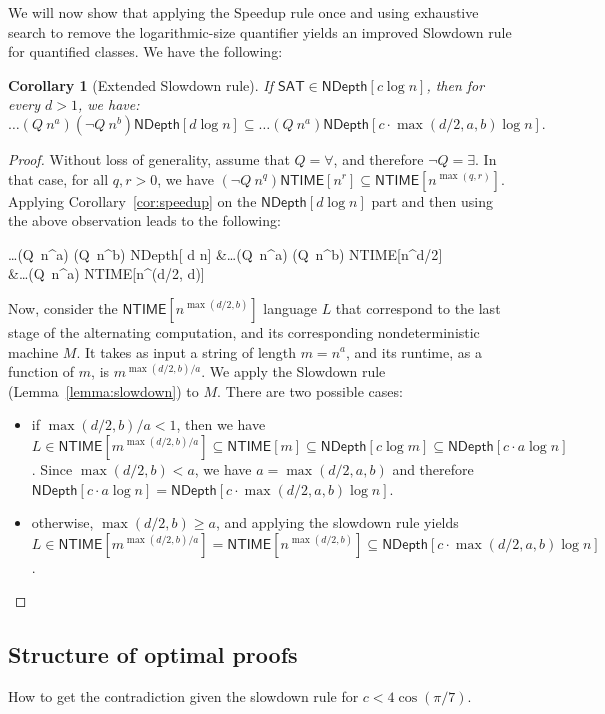 \documentclass[a4paper, 11pt]{article}
\theoremstyle{plain}
\newtheorem{corollary}[theorem]{Corollary}
\theoremstyle{definition}
\theoremstyle{remark}
\newcommand{\NTIME}{\textsf{NTIME}}%
\newcommand{\SAT}{\textsf{SAT}}%
\newcommand{\ND}{\textsf{NDepth}}%
\newcommand{\NDL}[1]{\ND[ #1 \log n]}%
\begin{document}
We will now show that applying the Speedup rule once and
using exhaustive search to remove the logarithmic-size quantifier
yields an improved Slowdown rule for quantified classes.
We have the following:
\begin{corollary}[Extended Slowdown rule]\label{cor:extended_slowdown}
	If $\SAT{}\in \NDL{c}$, then for every $d > 1$, we have:
	\[\ldots (Q~n^{a}) (\neg Q~n^b) \NDL{d}
	\subseteq \ldots (Q~n^{a}) \NDL{c\cdot\max(d/2, a, b)}.\]
\end{corollary}
\begin{proof}
	Without loss of generality, assume that $Q = \forall$, and therefore $\neg Q = \exists$.
	In that case, for all $q, r > 0$, we have $(\neg Q~n^q) \NTIME[n^r] \subseteq \NTIME[n^{\max(q,r)}] $.
	Applying Corollary~\ref{cor:speedup} on the $\NDL{d}$ part and then using the 
	above observation leads to the following:
	\begin{flalign*}
	\ldots (Q~n^{a}) (\neg Q~n^b) \NDL{d} 
	&\subseteq \ldots (Q~n^{a}) (\neg Q~n^b) \NTIME[n^{d/2}]\\	
	&\subseteq \ldots (Q~n^{a}) \NTIME[n^{\max(d/2, d)}]	
	\end{flalign*}

	Now, consider the $\NTIME[n^{\max(d/2, b)}]$ language $L$
	that correspond to the last stage of the alternating 
	computation, and its corresponding nondeterministic machine $M$. 
	It takes as input a string of length $m = n^{a}$, and its runtime, as a function of $m$, 
	is $m^{\max(d/2, b)/a}$.
	We apply the Slowdown rule (Lemma~\ref{lemma:slowdown}) to $M$. There are two possible cases:
	\begin{itemize}
		\item if $\max(d/2, b)/a < 1$, then we have 
		$L \in \NTIME[m^{\max(d/2, b)/a}] \subseteq \NTIME[m]
		\subseteq \ND[c \log m] \subseteq \NDL{c \cdot a}$.
		Since  $\max(d/2, b) < a$, we have $a = \max(d/2, a, b)$ and therefore 
		$\NDL{c \cdot a} = \NDL{c\cdot\max(d/2, a, b)}$.
		\item otherwise, $\max(d/2, b) \ge a$, and applying the slowdown rule yields
		$L \in \NTIME[m^{\max(d/2, b)/a}] =  \NTIME[n^{\max(d/2, b)}] \subseteq \NDL{c \cdot \max(d/2, a, b)}$.
	\end{itemize}
\end{proof}


\subsection{Structure of optimal proofs}
How to get the contradiction given the slowdown rule for $c < 4\cos(\pi /7)$.
\end{document}
